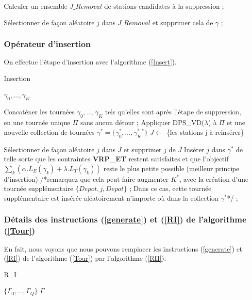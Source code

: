 {\begin{algorithm}
\begin{algorithmic}[1]
			\INITIALISATION
			\STATE Calculer un ensemble $J\_Removal$ de stations candidates à la suppression ;
			
			\vspace{0.3cm}
			
			\BOUCLEPRINCIPAL
			\STATE Sélectionner de façon aléatoire $j$ dans $J\_Removal$ et supprimer cela de $\gamma$ ;
			\ENDFOR
		\end{algorithmic}
	\end{algorithm}
	
	\subsubsection{Opérateur d'insertion}
	On effectue l'étape d'insertion avec l'algorithme (\ref{Insert}).
	\begin{algorithm}
		\caption{Insertion}
		\label{Insert}
		\begin{algorithmic}[1]
			\REQUIRE $\gamma_0, \dots, \gamma_K$
			\ENSURE 
			\hline
			\vspace{0.5cm}
			
			\INITIALISATION
			\STATE Concaténer les tournées $\gamma_0, \dots, \gamma_K$  tels qu'elles sont après l'étape de suppression, en une tournée unique $\Pi$ sans aucun détour ;
			\STATE Appliquer DPS\_VD($\lambda$) à $\Pi$ et une nouvelle collection de tournées $\gamma^*=\{\gamma^*_0, \dots, \gamma^*_K^*\}$
			\STATE $J \leftarrow$ \{les stations j à reinsérer\}%
			
			\vspace{0.3cm}
			
			\BOUCLEPRINCIPAL
			\STATE Sélectionner de façon aléatoire $j$ dans $J$ et supprimer $j$ de $J$
			\STATE Insérer $j$ dans $\gamma^*$ de telle sorte que les contraintes \textbf{VRP\_ET} restent satisfaites et que l'objectif $\sum_k (\alpha.L_E(\gamma_k) + \lambda.L_T(\gamma_k))$ reste le plus petite possible (meilleur principe d'insertion) /*remarquez que cela peut faire augmenter $K^*$, avec la création d'une tournée supplémentaire $\{Depot, j, Depot\}$ ; Dans ce cas, cette tournée supplémentaire est insérée aléatoirement n'importe où dans la collection $\gamma^*$*/ ;
			\ENDWHILE
		\end{algorithmic}
	\end{algorithm}
	
	
	\subsubsection{Détails des instructions (\ref{generate}) et (\ref{RI}) de l'algorithme (\ref{Tour})}
	En fait, nous voyons que nous pouvons remplacer les instructions (\ref{generate}) et (\ref{RI}) de l'algorithme (\ref{Tour}) par l'algorithme (\ref{RII}).
	\begin{algorithm}
		\caption{R\_I}
		\label{RII}
		\begin{algorithmic}[1]
			\REQUIRE $\{\Gamma_0, \dots, \Gamma_Q\}$%
			\ENSURE $\Gamma$
			\hline
			\vspace{0.5cm}
			

\end{algorithmic}
\end{algorithm}}
